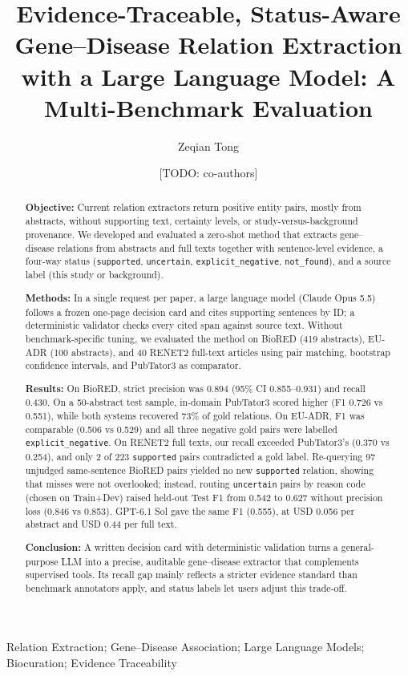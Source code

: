 \documentclass[preprint,10pt,letterpaper]{elsarticle}
\newcommand{\st}[1]{\texttt{#1}}             %
\newcommand{\todo}[1]{\textcolor{stneg}{[TODO: #1]}}
\begin{document}
\begin{frontmatter}

\title{Evidence-Traceable, Status-Aware Gene--Disease Relation Extraction with a Large Language Model: A Multi-Benchmark Evaluation}

\author[a]{Zeqian Tong}
\author[b]{\todo{co-authors}}
\affiliation[a]{organization={\todo{affiliation}}}
\affiliation[b]{organization={\todo{affiliation}}}

\begin{abstract}
\setlength{\parindent}{0pt}\setlength{\parskip}{6pt}%
\textbf{Objective:} Current relation extractors return positive entity pairs, mostly from abstracts, without supporting text, certainty levels, or study-versus-background provenance. We developed and evaluated a zero-shot method that extracts gene--disease relations from abstracts and full texts together with sentence-level evidence, a four-way status (\st{supported}, \st{uncertain}, \st{explicit\_negative}, \st{not\_found}), and a source label (this study or background).

\textbf{Methods:} In a single request per paper, a large language model (Claude Opus 5.5) follows a frozen one-page decision card and cites supporting sentences by ID; a deterministic validator checks every cited span against source text. Without benchmark-specific tuning, we evaluated the method on BioRED (419 abstracts), EU-ADR (100 abstracts), and 40 RENET2 full-text articles using pair matching, bootstrap confidence intervals, and PubTator3 as comparator.

\textbf{Results:} On BioRED, strict precision was 0.894 (95\% CI 0.855--0.931) and recall 0.430. On a 50-abstract test sample, in-domain PubTator3 scored higher (F1 0.726 vs 0.551), while both systems recovered 73\% of gold relations. On EU-ADR, F1 was comparable (0.506 vs 0.529) and all three negative gold pairs were labelled \st{explicit\_negative}. On RENET2 full texts, our recall exceeded PubTator3's (0.370 vs 0.254), and only 2 of 223 \st{supported} pairs contradicted a gold label. Re-querying 97 unjudged same-sentence BioRED pairs yielded no new \st{supported} relation, showing that misses were not overlooked; instead, routing \st{uncertain} pairs by reason code (chosen on Train+Dev) raised held-out Test F1 from 0.542 to 0.627 without precision loss (0.846 vs 0.853). GPT-6.1 Sol gave the same F1 (0.555), at USD 0.056 per abstract and USD 0.44 per full text.

\textbf{Conclusion:} A written decision card with deterministic validation turns a general-purpose LLM into a precise, auditable gene--disease extractor that complements supervised tools. Its recall gap mainly reflects a stricter evidence standard than benchmark annotators apply, and status labels let users adjust this trade-off.
\end{abstract}

\begin{keyword}
Relation Extraction; Gene--Disease Association; Large Language Models; Biocuration; Evidence Traceability
\end{keyword}

\end{frontmatter}
\end{document}
